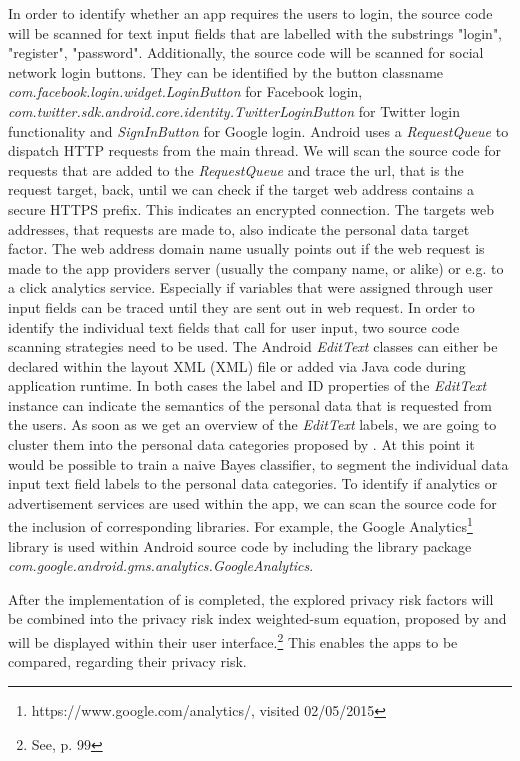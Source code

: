 \documentclass[
	a4paper,
	oneside,
	12pt,
	liststotocnumbered
]{article}
\let\cite\textcite
\begin{document}
In order to identify whether an app requires the users to login, the source code will be scanned for text input fields that are labelled with the substrings "login", "register", "password". 
Additionally, the source code will be scanned for social network login buttons.
They can be identified by the button classname \textit{com.facebook.login.widget.LoginButton} for Facebook login, \textit{com.twitter.sdk.android.core.identity.TwitterLoginButton} for Twitter login functionality and \textit{SignInButton} for Google login.
Android uses a \textit{RequestQueue} to dispatch HTTP requests from the main thread. 
We will scan the source code for requests that are added to the \textit{RequestQueue} and trace the url, that is the request target, back, until we can check if the target web address contains a secure HTTPS prefix.
This indicates an encrypted connection.
The targets web addresses, that requests are made to, also indicate the personal data target factor. The web address domain name usually points out if the web request is made to the app providers server (usually the company name, or alike) or e.g. to a click analytics service.
Especially if variables that were assigned through user input fields can be traced until they are sent out in web request.
In order to identify the individual text fields that call for user input, two source code scanning strategies need to be used.
The Android \textit{EditText} classes can either be declared within the layout \acl{XML} (\acs{XML}) file or added via Java code during application runtime.
In both cases the label and ID properties of the \textit{EditText} instance can indicate the semantics of the personal data that is requested from the users.
As soon as we get an overview of the \textit{EditText} labels, we are going to cluster them into the personal data categories proposed by \cite{Bruggemann2016}.
At this point it would be possible to train a naive Bayes classifier, to segment the individual data input text field labels to the personal data categories.
To identify if analytics or advertisement services are used within the app, we can scan the source code for the inclusion of corresponding libraries. For example, the Google Analytics\footnote{https://www.google.com/analytics/, visited 02/05/2015} library is used within Android source code by including the library package \textit{com.google.android.gms.analytics.GoogleAnalytics}.

After the implementation of is completed, the explored privacy risk factors will be combined into the privacy risk index weighted-sum equation, proposed by \cite{Bruggemann2016} and will be displayed within their user interface.\footnote{See\cite{Bruggemann2016}, p. 99}
This enables the \mH apps to be compared, regarding their privacy risk.
\end{document}
